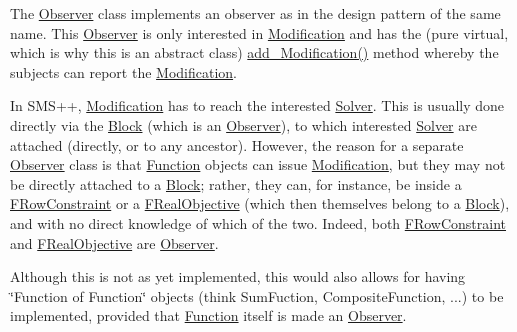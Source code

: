 The \mbox{\hyperlink{class_s_m_spp__di__unipi__it_1_1_observer}{Observer}} class implements an observer as in the design pattern of the same name. This \mbox{\hyperlink{class_s_m_spp__di__unipi__it_1_1_observer}{Observer}} is only interested in \mbox{\hyperlink{class_s_m_spp__di__unipi__it_1_1_modification}{Modification}} and has the (pure virtual, which is why this is an abstract class) \mbox{\hyperlink{class_s_m_spp__di__unipi__it_1_1_observer_a4ac2234c8026ccbe13860a33fc4ef14e}{add\+\_\+\+Modification()}} method whereby the subjects can report the \mbox{\hyperlink{class_s_m_spp__di__unipi__it_1_1_modification}{Modification}}.

In S\+M\+S++, \mbox{\hyperlink{class_s_m_spp__di__unipi__it_1_1_modification}{Modification}} has to reach the interested \mbox{\hyperlink{class_s_m_spp__di__unipi__it_1_1_solver}{Solver}}. This is usually done directly via the \mbox{\hyperlink{class_s_m_spp__di__unipi__it_1_1_block}{Block}} (which is an \mbox{\hyperlink{class_s_m_spp__di__unipi__it_1_1_observer}{Observer}}), to which interested \mbox{\hyperlink{class_s_m_spp__di__unipi__it_1_1_solver}{Solver}} are attached (directly, or to any ancestor). However, the reason for a separate \mbox{\hyperlink{class_s_m_spp__di__unipi__it_1_1_observer}{Observer}} class is that \mbox{\hyperlink{class_s_m_spp__di__unipi__it_1_1_function}{Function}} objects can issue \mbox{\hyperlink{class_s_m_spp__di__unipi__it_1_1_modification}{Modification}}, but they may not be directly attached to a \mbox{\hyperlink{class_s_m_spp__di__unipi__it_1_1_block}{Block}}; rather, they can, for instance, be inside a \mbox{\hyperlink{class_s_m_spp__di__unipi__it_1_1_f_row_constraint}{F\+Row\+Constraint}} or a \mbox{\hyperlink{class_s_m_spp__di__unipi__it_1_1_f_real_objective}{F\+Real\+Objective}} (which then themselves belong to a \mbox{\hyperlink{class_s_m_spp__di__unipi__it_1_1_block}{Block}}), and with no direct knowledge of which of the two. Indeed, both \mbox{\hyperlink{class_s_m_spp__di__unipi__it_1_1_f_row_constraint}{F\+Row\+Constraint}} and \mbox{\hyperlink{class_s_m_spp__di__unipi__it_1_1_f_real_objective}{F\+Real\+Objective}} are \mbox{\hyperlink{class_s_m_spp__di__unipi__it_1_1_observer}{Observer}}.

Although this is not as yet implemented, this would also allows for having \char`\"{}\+Function of Function\char`\"{} objects (think Sum\+Fuction, Composite\+Function, ...) to be implemented, provided that \mbox{\hyperlink{class_s_m_spp__di__unipi__it_1_1_function}{Function}} itself is made an \mbox{\hyperlink{class_s_m_spp__di__unipi__it_1_1_observer}{Observer}}.

